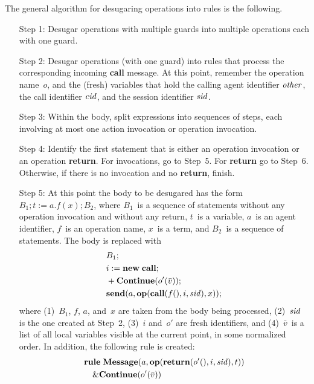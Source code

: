 \documentclass[a4paper,12pt,oneside,fleqn]{book} %
\begin{document}
The general algorithm for desugaring operations into rules is the
following.
\begin{itemize}
\item[Step 1:]
  Desugar operations with multiple guards into multiple operations each
  with one guard.
\item[Step 2:]
  Desugar operations (with one guard) into rules that process the
  corresponding incoming {\bf call} message. At this point, remember the
  operation name~$o$, and the (fresh) variables that hold the calling agent
  identifier $\it other$, the call identifier $\it cid$, and the session
  identifier $\it sid$.
\item[Step 3:]
  Within the body, split expressions into sequences of steps, each
  involving at most one action invocation or operation invocation.
\item[Step 4:]
  Identify the first statement that is either an operation invocation or an
  operation {\bf return}. For invocations, go to Step~5. For {\bf return}
  go to Step~6. Otherwise, if there is no invocation and no {\bf return},
  finish.
\item[Step 5:]
  At this point the body to be desugared has the form $B_1;t:=a.f(x); B_2$,
  where $B_1$~is a sequence of statements without any operation invocation
  and without any return, $t$~is a variable, $a$~is an agent identifier,
  $f$~is an operation name, $x$~is a term, and $B_2$~is a sequence of
  statements. The body is replaced with
\begin{align}
\begin{aligned}
&B_1; \\
&i:={\bf new}\;{\bf call}; \\
&+{\bf Continue}(o'(\bar v)); \\
&{\bf send}(a, {\bf op}({\bf call}(f(), i, {\it sid}), x));
\end{aligned}
\end{align}
  where (1)~$B_1$, $f$, $a$, and~$x$ are taken from the body being
  processed, (2)~$\it sid$ is the one created at Step~2, (3)~$i$ and~$o'$
  are fresh identifiers, and (4)~$\bar v$~is a list of all local variables
  visible at the current point, in some normalized order. In addition, the
  following rule is created:
\begin{align}
\begin{aligned}
&{\bf rule}\;{\bf Message}(a,{\bf op}({\bf return}(o'(),i,{\it sid}), t))\\
&\quad\& {\bf Continue}(o'(\bar v))\\

\end{aligned}
\end{align}
\end{itemize}
\end{document}

